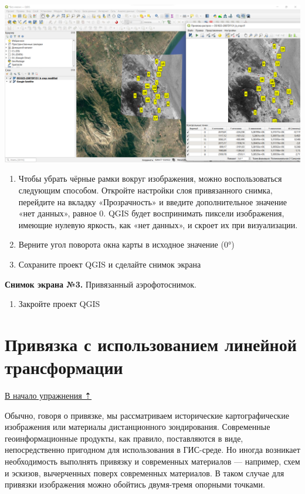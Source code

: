 \documentclass[
  12pt,
]{book}
\providecommand{\tightlist}{%
  \setlength{\itemsep}{0pt}\setlength{\parskip}{0pt}}
\begin{document}
\includegraphics{images/Ex05_Reference/RasterReference8.png}

\begin{enumerate}
\def\labelenumi{\arabic{enumi}.}
\setcounter{enumi}{10}
\item
  Чтобы убрать чёрные рамки вокруг изображения, можно воспользоваться следующим способом. Откройте настройки слоя привязанного снимка, перейдите на вкладку «Прозрачность» и введите дополнительное значение «нет данных», равное 0. QGIS будет воспринимать пиксели изображения, имеющие нулевую яркость, как «нет данных», и скроет их при визуализации.
\item
  Верните угол поворота окна карты в исходное значение (0°)
\item
  Сохраните проект QGIS и сделайте снимок экрана
\end{enumerate}

\textbf{Снимок экрана №3.} Привязанный аэрофотоснимок.

\begin{enumerate}
\def\labelenumi{\arabic{enumi}.}
\setcounter{enumi}{13}
\tightlist
\item
  Закройте проект QGIS
\end{enumerate}

\hypertarget{raster-reference-linear}{%
\section{Привязка с использованием линейной трансформации}\label{raster-reference-linear}}

\protect\hyperlink{raster-reference}{В начало упражнения ⇡}

Обычно, говоря о привязке, мы рассматриваем исторические картографические изображения или материалы дистанционного зондирования. Современные геоинформационные продукты, как правило, поставляются в виде, непосредственно пригодном для использования в ГИС-среде. Но иногда возникает необходимость выполнять привязку и современных материалов --- например, схем и эскизов, вычерченных поверх современных материалов. В таком случае для привязки изображения можно обойтись двумя-тремя опорными точками.
\end{document}
